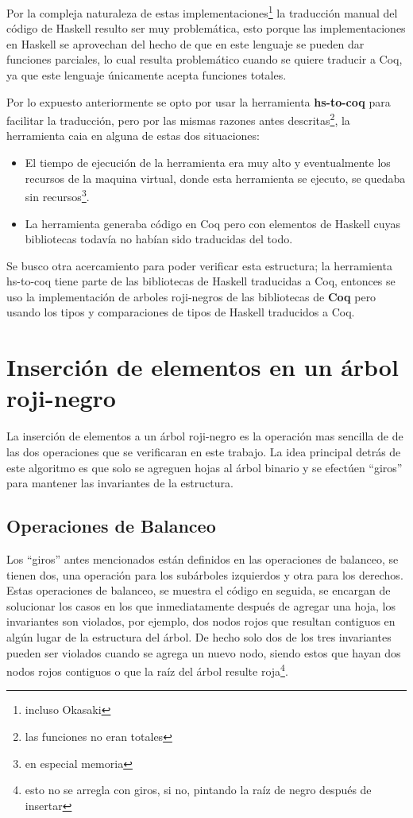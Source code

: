 \documentclass[letterpaper,12pt,oneside]{book}
\newcommand{\coq}{\textbf{Coq}}
\newcommand{\arn}{árbol roji-negro}
\newcommand{\arns}{arboles roji-negros}
\theoremstyle{plain}
\theoremstyle{definition}
\theoremstyle{remark}
\begin{document}
Por la compleja naturaleza de estas implementaciones\footnote{incluso Okasaki} la traducción manual del código de Haskell resulto ser muy problemática,
esto porque las implementaciones en Haskell se aprovechan del hecho de que en este lenguaje se pueden dar funciones parciales, 
lo cual resulta problemático cuando se quiere traducir a Coq, ya que este lenguaje únicamente acepta funciones totales.

Por lo expuesto anteriormente se opto por usar la herramienta \textbf{hs-to-coq} para facilitar la traducci\'on, pero por las mismas razones antes descritas\footnote{las funciones no eran totales},
la herramienta caia en alguna de estas dos situaciones:

\begin{itemize}
    \item El tiempo de ejecuci\'on de la herramienta era muy alto y eventualmente los recursos de la maquina virtual, donde esta herramienta se ejecuto, se quedaba sin recursos\footnote{en especial memoria}.
    \item La herramienta generaba c\'odigo en Coq pero con elementos de Haskell cuyas bibliotecas todavía no habían sido traducidas del todo.
\end{itemize}{}

Se busco otra acercamiento para poder verificar esta estructura; la herramienta hs-to-coq tiene parte de las bibliotecas de Haskell 
traducidas a Coq, entonces se uso la implementación de {\arns} de las bibliotecas de {\coq}\cite{MSetRBT} pero usando los tipos y comparaciones de tipos de Haskell traducidos a Coq.


\section{Inserción de elementos en un {{{\arn}}}}

La inserci\'on de elementos a un {{{\arn}}} es la operaci\'on mas sencilla de de las dos operaciones que se verificaran en este trabajo. La idea principal detrás de este algoritmo es que 
solo se agreguen hojas al \'arbol binario y se efectúen ``giros'' para mantener las invariantes de la estructura.
\subsection{Operaciones de Balanceo}
Los ``giros'' antes mencionados están definidos en las operaciones de balanceo, se tienen dos, una operaci\'on para los subárboles izquierdos y otra para los 
derechos. Estas operaciones de balanceo, se muestra el c\'odigo en seguida, se encargan de solucionar los
casos en los que inmediatamente después de agregar una hoja, los invariantes son violados, por ejemplo, 
dos nodos rojos que resultan contiguos en algún lugar de la estructura del \'arbol. De hecho solo dos de 
los tres invariantes pueden ser violados cuando se agrega un nuevo nodo, siendo estos que hayan dos nodos
rojos contiguos o que la raíz del árbol resulte roja\footnote{esto no se arregla con giros, si no, pintando la raíz de negro después de insertar}.
\end{document}
